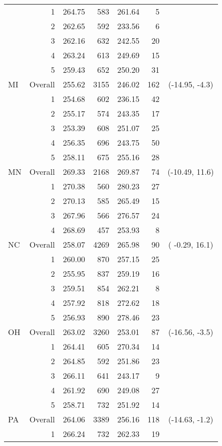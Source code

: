 \begin{longtable}{lrrr@{\extracolsep{.25cm}}rrc}
   & 1 & 264.75 & 583 & 261.64 &   5 &  \\ 
   & 2 & 262.65 & 592 & 233.56 &   6 &  \\ 
   & 3 & 262.16 & 632 & 242.55 &  20 &  \\ 
   & 4 & 263.24 & 613 & 249.69 &  15 &  \\ 
   & 5 & 259.43 & 652 & 250.20 &  31 &  \\ 
   \hline
MI & Overall & 255.62 & 3155 & 246.02 & 162 & (-14.95,  -4.3) \\ 
   & 1 & 254.68 & 602 & 236.15 &  42 &  \\ 
   & 2 & 255.17 & 574 & 243.35 &  17 &  \\ 
   & 3 & 253.39 & 608 & 251.07 &  25 &  \\ 
   & 4 & 256.35 & 696 & 243.75 &  50 &  \\ 
   & 5 & 258.11 & 675 & 255.16 &  28 &  \\ 
   \hline
MN & Overall & 269.33 & 2168 & 269.87 &  74 & (-10.49,  11.6) \\ 
   & 1 & 270.38 & 560 & 280.23 &  27 &  \\ 
   & 2 & 270.13 & 585 & 265.49 &  15 &  \\ 
   & 3 & 267.96 & 566 & 276.57 &  24 &  \\ 
   & 4 & 268.69 & 457 & 253.93 &   8 &  \\ 
   \hline
NC & Overall & 258.07 & 4269 & 265.98 &  90 & ( -0.29,  16.1) \\ 
   & 1 & 260.00 & 870 & 257.15 &  25 &  \\ 
   & 2 & 255.95 & 837 & 259.19 &  16 &  \\ 
   & 3 & 259.51 & 854 & 262.21 &   8 &  \\ 
   & 4 & 257.92 & 818 & 272.62 &  18 &  \\ 
   & 5 & 256.93 & 890 & 278.46 &  23 &  \\ 
   \hline
OH & Overall & 263.02 & 3260 & 253.01 &  87 & (-16.56,  -3.5) \\ 
   & 1 & 264.41 & 605 & 270.34 &  14 &  \\ 
   & 2 & 264.85 & 592 & 251.86 &  23 &  \\ 
   & 3 & 266.11 & 641 & 243.17 &   9 &  \\ 
   & 4 & 261.92 & 690 & 249.08 &  27 &  \\ 
   & 5 & 258.71 & 732 & 251.92 &  14 &  \\ 
   \hline
PA & Overall & 264.06 & 3389 & 256.16 & 118 & (-14.63,  -1.2) \\ 
   & 1 & 266.24 & 732 & 262.33 &  19 &  \\ 

\end{longtable}
